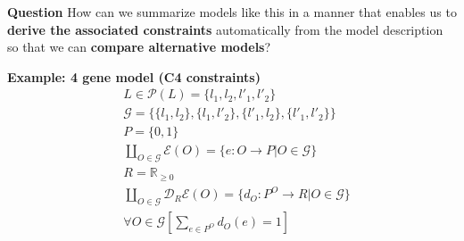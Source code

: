 \begin{frame}
\begin{block}{\textbf{Question}}
How can we summarize models like this in a manner that enables us to \textbf{derive the associated constraints} automatically from the model description so that we can \textbf{compare alternative models}?
\end{block}
\begin{block}{\textbf{Example: 4 gene model (C4 constraints)}}
\begin{equation*}
\begin{aligned}
& L \in \mathcal{P}(L) = \{l_1,l_2,l'_1,l'_2\}\\
& \mathcal{G} = \{\{l_1,l_2 \},\{l_1,l'_2 \},\{l'_1,l_2\},\{l'_1,l'_2\} \}\\
& P = \{0,1\}\\
& \coprod_{O \in \mathcal{G}} \mathcal{E}(O) = \{e \colon O \rightarrow P | O \in \mathcal{G} \}\\
& R = \mathbb{R}_{\geq 0}\\
& \coprod_{O \in \mathcal{G}} \mathcal{D}_R\mathcal{E}(O) = \{d_O \colon P^O \rightarrow R | O \in \mathcal{G} \}\\
& \forall O \in \mathcal{G} \left[ \sum_{e \in P^O} d_O(e) = 1 \right]
\end{aligned}
\end{equation*}
\end{block}
\end{frame}
